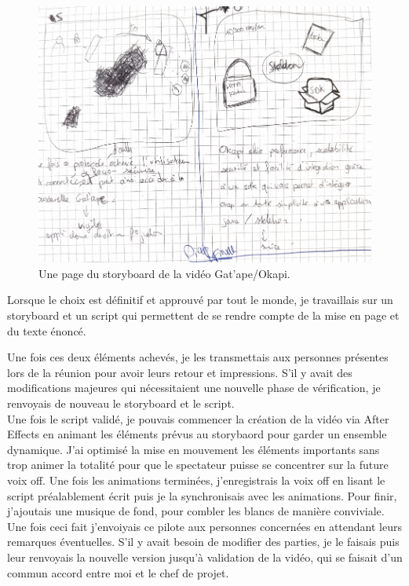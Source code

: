 \begin{figure}[htp]
  \centering
  \includegraphics[width=15cm]{images/sb/sb1}
  \caption{Une page du storyboard de la vidéo Gat'ape/Okapi.}
  \label{sbzbus}
\end{figure}




Lorsque le choix est définitif et approuvé par tout le monde, je travaillais sur un storyboard et un script qui permettent de se rendre compte de la mise en page et du texte énoncé. 


Une fois ces deux éléments achevés, je les transmettais aux personnes présentes lors de la réunion pour avoir leurs retour et impressions. S'il y avait des modifications majeures qui nécessitaient une nouvelle phase de vérification, je renvoyais de nouveau le storyboard et le script.\\


Une fois le script validé, je pouvais commencer la création de la vidéo via After Effects en animant les éléments prévus au storybaord pour garder un ensemble dynamique. J'ai optimisé la mise en mouvement les éléments importants sans trop animer la totalité pour que le spectateur puisse se concentrer sur la future voix off. Une fois les animations terminées, j'enregistrais la voix off en lisant le script préalablement écrit puis je la synchronisais avec les animations. Pour finir, j'ajoutais une musique de fond, pour combler les blancs de manière conviviale.\\

Une fois ceci fait j'envoiyais ce pilote aux personnes concernées en attendant leurs remarques éventuelles. S'il y avait besoin de modifier des parties, je le faisais puis leur renvoyais la nouvelle version jusqu'à validation de la vidéo, qui se faisait d'un commun accord entre moi et le chef de projet.


